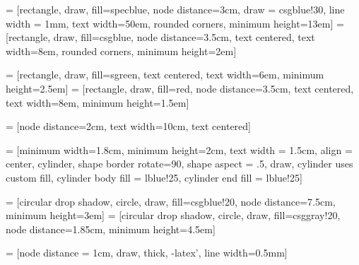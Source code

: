 \documentclass{article}
\begin{document}
	
\pagestyle{empty}

 = [rectangle, draw, fill=specblue, node distance=3cm, draw = csgblue!30, line width = 1mm,
text width=50em, rounded corners, minimum height=13em]
 = [rectangle, draw, fill=csgblue, node distance=3.5cm, text centered,
text width=8em, rounded corners, minimum height=2em]

 = [rectangle, draw, fill=sgreen, text centered,
text width=6em, minimum height=2.5em]
 = [rectangle, draw, fill=red, node distance=3.5cm, text centered,
text width=8em, minimum height=1.5em]

 = [node distance=2cm, text width=10cm, text centered]

 = [minimum width=1.8cm, minimum height=2cm, text width = 1.5cm, align = center,
cylinder, shape border rotate=90, shape aspect = .5, draw, 
cylinder uses custom fill, cylinder body fill = lblue!25, cylinder end fill = lblue!25]

 = [circular drop shadow, circle, draw, fill=csgblue!20,
node distance=7.5cm, minimum height=3em]
 = [circular drop shadow, circle, draw, fill=csggray!20,
node distance=1.85cm, minimum height=4.5em]

  = [node distance = 1cm, draw, thick, -latex', line width=0.5mm]

\end{document}
